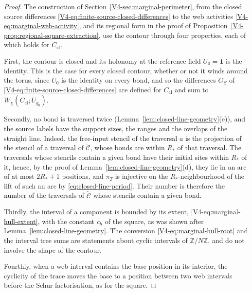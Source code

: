 \documentclass[11pt]{article}
\newcommand{\id}{\mathbf 1}
\numberwithin{equation}{section}
\theoremstyle{remark}
\theoremstyle{plain}
\begin{document}
\begin{proof}
The construction of Section~\ref{V4-sec:marginal-perimeter}, from the closed source differences \eqref{V4-eq:finite-source-closed-differences} to the web activities \eqref{V4-eq:marginal-web-activity}, and its regional form in the proof of Proposition~\ref{V4-prop:regional-square-extraction}, use the contour through four properties, each of which holds for $C_{\mathrm{cl}}$.

First, the contour is closed and its holonomy at the reference field $U_0=\id$ is the identity. This is the case for every closed contour, whether or not it winds around the torus, since $U_0$ is the identity on every bond, and so the differences $G_S$ of \eqref{V4-eq:finite-source-closed-differences} are defined for $C_{\mathrm{cl}}$ and sum to $W_{\chi}(C_{\mathrm{cl}};U_{g_0})$.

Secondly, no bond is traversed twice (Lemma~\ref{lem:closed-line-geometry}(e)), and the source labels have the support sizes, the ranges and the overlaps of the straight line. Indeed, the free-input stencil of the traversal $a$ is the projection of the stencil of a traversal of $\widetilde{\mathcal C}$, whose bonds are within $R_*$ of that traversal. The traversals whose stencils contain a given bond have their initial sites within $R_*$ of it, hence, by the proof of Lemma~\ref{lem:closed-line-geometry}(d), they lie in an arc of at most $2R_*+1$ positions, and $\pi_T$ is injective on the $R_*$-neighbourhood of the lift of such an arc by \eqref{eq:closed-line-period}. Their number is therefore the number of the traversals of $\widetilde{\mathcal C}$ whose stencils contain a given bond.

Thirdly, the interval of a component is bounded by its extent, \eqref{V4-eq:marginal-hull-extent}, with the constant $c_h$ of the square, as was shown after Lemma~\ref{lem:closed-line-geometry}. The conversion \eqref{V4-eq:marginal-hull-root} and the interval tree sums are statements about cyclic intervals of $\mathbb Z/N\mathbb Z$, and do not involve the shape of the contour.

Fourthly, when a web interval contains the base position in its interior, the cyclicity of the trace moves the base to a position between two web intervals before the Schur factorisation, as for the square.


\end{proof}
\end{document}
